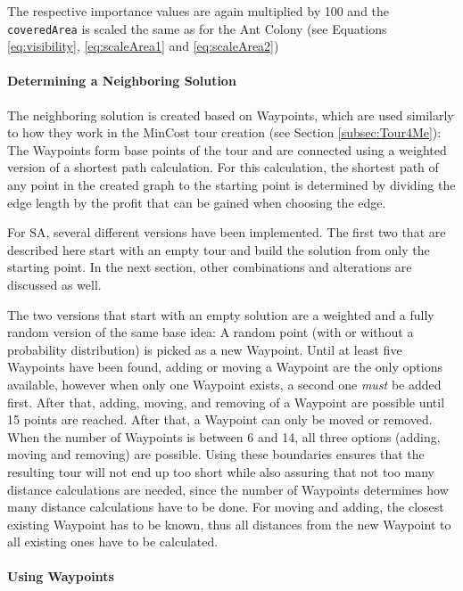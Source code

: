 The respective importance values are again multiplied by 100 and the \texttt{coveredArea} is scaled the same as for the Ant Colony (see Equations \ref{eq:visibility}, \ref{eq:scaleArea1} and \ref{eq:scaleArea2})

\paragraph{Determining a Neighboring Solution}

The neighboring solution is created based on Waypoints, which are used similarly to how they work in the MinCost tour creation (see Section \ref{subsec:Tour4Me}):
The Waypoints form base points of the tour and are connected using a weighted version of a shortest path calculation. 
For this calculation, the shortest path of any point in the created graph to the starting point is determined by dividing the edge length by the profit that can be gained when choosing the edge. 

For SA, several different versions have been implemented.
The first two that are described here start with an empty tour and build the solution from only the starting point.
In the next section, other combinations and alterations are discussed as well.

The two versions that start with an empty solution are a weighted and a fully random version of the same base idea:
A random point (with or without a probability distribution) is picked as a new Waypoint. 
Until at least five Waypoints have been found, adding or moving a Waypoint are the only options available, however when only one Waypoint exists, a second one \textit{must} be added first.
After that, adding, moving, and removing of a Waypoint are possible until 15 points are reached.
After that, a Waypoint can only be moved or removed.
When the number of Waypoints is between 6 and 14, all three options (adding, moving and removing) are possible.
Using these boundaries ensures that the resulting tour will not end up too short while also assuring that not too many distance calculations are needed, since the number of Waypoints determines how many distance calculations have to be done.
For moving and adding, the closest existing Waypoint has to be known, thus all distances from the new Waypoint to all existing ones have to be calculated.

\paragraph{Using Waypoints}

